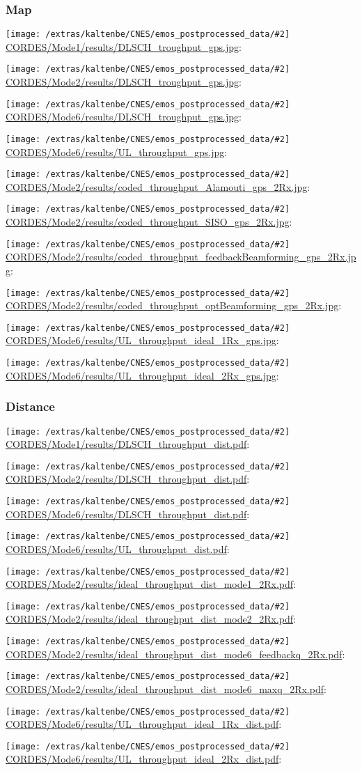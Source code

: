 \documentclass[a4paper,10pt]{article}
\newcommand{\printfile}[2][]{
 \begin{minipage}{8cm}
  \centering
  \texttt{[image: /extras/kaltenbe/CNES/emos\_postprocessed\_data/\#2]}
  \url{#2}: #1

 \end{minipage}
}
\begin{document}
\subsubsection{Map}

\printfile{CORDES/Mode1/results/DLSCH_troughput_gps.jpg}
\printfile{CORDES/Mode2/results/DLSCH_troughput_gps.jpg}

\printfile{CORDES/Mode6/results/DLSCH_troughput_gps.jpg}
\printfile{CORDES/Mode6/results/UL_throughput_gps.jpg}

\printfile{CORDES/Mode2/results/coded_throughput_Alamouti_gps_2Rx.jpg}
\printfile{CORDES/Mode2/results/coded_throughput_SISO_gps_2Rx.jpg}

\printfile{CORDES/Mode2/results/coded_throughput_feedbackBeamforming_gps_2Rx.jpg}
\printfile{CORDES/Mode2/results/coded_throughput_optBeamforming_gps_2Rx.jpg}

\printfile{CORDES/Mode6/results/UL_throughput_ideal_1Rx_gps.jpg}
\printfile{CORDES/Mode6/results/UL_throughput_ideal_2Rx_gps.jpg}

\subsubsection{Distance}

\printfile{CORDES/Mode1/results/DLSCH_throughput_dist.pdf}
\printfile{CORDES/Mode2/results/DLSCH_throughput_dist.pdf}

\printfile{CORDES/Mode6/results/DLSCH_throughput_dist.pdf}
\printfile{CORDES/Mode6/results/UL_throughput_dist.pdf}


\printfile{CORDES/Mode2/results/ideal_throughput_dist_mode1_2Rx.pdf}
%
\printfile{CORDES/Mode2/results/ideal_throughput_dist_mode2_2Rx.pdf}

\printfile{CORDES/Mode2/results/ideal_throughput_dist_mode6_feedbackq_2Rx.pdf}
%
\printfile{CORDES/Mode2/results/ideal_throughput_dist_mode6_maxq_2Rx.pdf}

\printfile{CORDES/Mode6/results/UL_throughput_ideal_1Rx_dist.pdf}
\printfile{CORDES/Mode6/results/UL_throughput_ideal_2Rx_dist.pdf}
\end{document}
